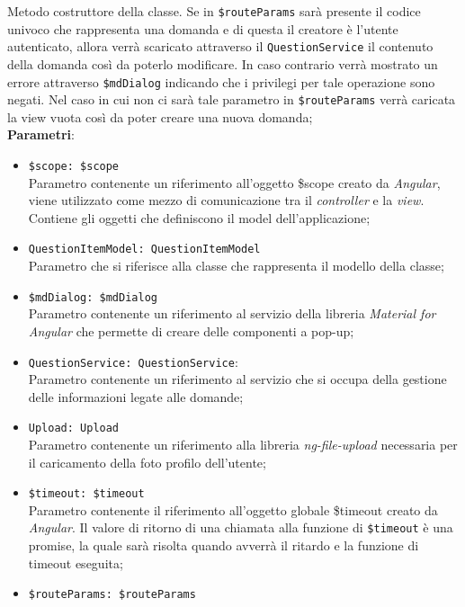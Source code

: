 \begin{itemize}
\begin{itemize}
		Metodo costruttore della classe. Se in \texttt{\$routeParams} sarà presente il codice univoco che rappresenta una domanda e di questa il creatore è l'utente autenticato, allora verrà scaricato attraverso il \texttt{QuestionService} il contenuto della domanda così da poterlo modificare. In caso contrario verrà mostrato un errore attraverso \texttt{\$mdDialog} indicando che i privilegi per tale operazione sono negati. Nel caso in cui non ci sarà tale parametro in \texttt{\$routeParams} verrà caricata la view vuota così da poter creare una nuova domanda; \\
		\textbf{Parametri}:
		\begin{itemize}
			\item \texttt{\$scope: \$scope} \\
			Parametro contenente un riferimento all'oggetto \$scope creato da \textit{Angular}, viene utilizzato come mezzo di comunicazione tra il \textit{controller} e la \textit{view}. Contiene gli oggetti che definiscono il model dell'applicazione;
			\item \texttt{QuestionItemModel: QuestionItemModel} \\ 
			Parametro che si riferisce alla classe che rappresenta il modello della classe;
			\item \texttt{\$mdDialog: \$mdDialog} \\
			Parametro contenente un riferimento al servizio della libreria \textit{Material for Angular} che permette di creare delle componenti a pop-up;
			\item \texttt{QuestionService: QuestionService}: \\
			Parametro contenente un riferimento al servizio che si occupa della gestione delle informazioni legate alle domande;
			\item \texttt{Upload: Upload} \\
			Parametro contenente un riferimento alla libreria \textit{ng-file-upload} necessaria per il caricamento della foto profilo dell'utente;
			\item \texttt{\$timeout: \$timeout} \\
			Parametro contenente il riferimento all'oggetto globale \$timeout creato da \textit{Angular}. 
			Il valore di ritorno di una chiamata alla funzione di \texttt{\$timeout} è una promise, la quale sarà risolta quando avverrà il ritardo e la funzione di timeout eseguita; 
			\item \texttt{\$routeParams: \$routeParams} \\

\end{itemize}
\end{itemize}
\end{itemize}
